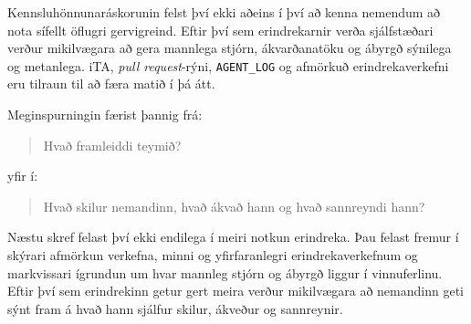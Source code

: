 \documentclass{kennsluakademia_conf}
\begin{document}
Kennsluhönnunaráskorunin felst því ekki aðeins í því að kenna nemendum
að nota sífellt öflugri gervigreind. Eftir því sem erindrekarnir verða
sjálfstæðari verður mikilvægara að gera mannlega stjórn, ákvarðanatöku
og ábyrgð sýnilega og metanlega. iTA, \emph{pull request}-rýni,
\texttt{AGENT\_LOG} og afmörkuð erindrekaverkefni eru tilraun til að
færa matið í þá átt.

Meginspurningin færist þannig frá:

\begin{quote}
Hvað framleiddi teymið?
\end{quote}

yfir í:

\begin{quote}
Hvað skilur nemandinn, hvað ákvað hann og hvað sannreyndi hann?
\end{quote}

Næstu skref felast því ekki endilega í meiri notkun erindreka. Þau
felast fremur í skýrari afmörkun verkefna, minni og yfirfaranlegri
erindrekaverkefnum og markvissari ígrundun um hvar mannleg stjórn og
ábyrgð liggur í vinnuferlinu. Eftir því sem erindrekinn getur gert meira
verður mikilvægara að nemandinn geti sýnt fram á hvað hann sjálfur
skilur, ákveður og sannreynir.



\end{document}
